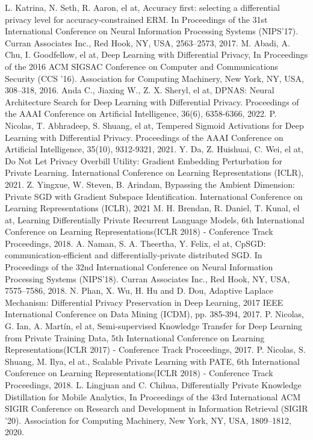 \documentclass[conference]{IEEEtran}
\begin{document}
\begin{thebibliography}{00}
 L. Katrina, N. Seth, R. Aaron, el at, Accuracy first: selecting a differential privacy level for accuracy-constrained ERM. In Proceedings of the 31st International Conference on Neural Information Processing Systems (NIPS'17). Curran Associates Inc., Red Hook, NY, USA, 2563–2573, 2017.
 M. Abadi, A. Chu, I. Goodfellow, el at, Deep Learning with Differential Privacy, In Proceedings of the 2016 ACM SIGSAC Conference on Computer and Communications Security (CCS '16). Association for Computing Machinery, New York, NY, USA, 308–318, 2016.
 Anda C., Jiaxing W., Z. X. Sheryl, el at, DPNAS: Neural Architecture Search for Deep Learning with Differential Privacy. Proceedings of the AAAI Conference on Artificial Intelligence, 36(6), 6358-6366, 2022.
 P. Nicolas, T. Abhradeep, S. Shuang, el at, Tempered Sigmoid Activations for Deep Learning with Differential Privacy. Proceedings of the AAAI Conference on Artificial Intelligence, 35(10), 9312-9321, 2021.
 Y. Da, Z. Huishuai, C. Wei, el at, Do Not Let Privacy Overbill Utility: Gradient Embedding Perturbation for Private Learning. International Conference on Learning Representations (ICLR), 2021.
 Z. Yingxue, W. Steven, B. Arindam, Bypassing the Ambient Dimension: Private SGD with Gradient Subspace Identification. International Conference on Learning Representations (ICLR), 2021
 M. H. Brendan, R. Daniel, T. Kunal, el at, Learning Differentially Private Recurrent Language Models, 6th International Conference on Learning Representations(ICLR 2018) - Conference Track Proceedings, 2018.
 A. Naman, S. A. Theertha, Y. Felix, el at, CpSGD: communication-efficient and differentially-private distributed SGD. In Proceedings of the 32nd International Conference on Neural Information Processing Systems (NIPS'18). Curran Associates Inc., Red Hook, NY, USA, 7575–7586, 2018.
 N. Phan, X. Wu, H. Hu and D. Dou, Adaptive Laplace Mechanism: Differential Privacy Preservation in Deep Learning, 2017 IEEE International Conference on Data Mining (ICDM), pp. 385-394, 2017.
 P. Nicolas, G. Ian, A. Martín, el at, Semi-supervised Knowledge Transfer for Deep Learning from Private Training Data, 5th International Conference on Learning Representations(ICLR 2017) - Conference Track Proceedings, 2017.
 P. Nicolas, S. Shuang, M. Ilya, el at., Scalable Private Learning with PATE, 6th International Conference on Learning Representations(ICLR 2018) - Conference Track Proceedings, 2018.
 L. Lingjuan  and C. Chihua, Differentially Private Knowledge Distillation for Mobile Analytics, In Proceedings of the 43rd International ACM SIGIR Conference on Research and Development in Information Retrieval (SIGIR '20). Association for Computing Machinery, New York, NY, USA, 1809–1812, 2020. 

\end{thebibliography}
\end{document}
